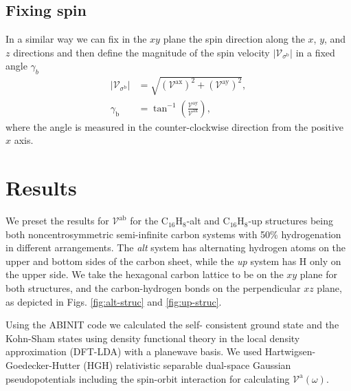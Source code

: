\documentclass[prb,11pt,tightenlines,twocolumn,aps]{revtex4-1}
\begin{document}

\subsection{Fixing spin}\label{sec:theory-fixspin}
In a similar way we can fix in the $xy$ plane the spin direction along the $x$,
$y$, and $z$ directions and then define the magnitude of the spin velocity $|\mathcal{V}_{\sigma^{\mathrm{b}}}|$ in a fixed angle $\gamma_{b}$
\begin{align}
|\mathcal{V}_{\sigma^{\mathrm{b}}}| 
&=
\sqrt{
(\mathcal{V}^{\mathrm{ax}})^{2} +
(\mathcal{V}^{\mathrm{ay}})^{2} 
}, \\
\gamma_{\mathrm{b}} 
&=
\tan^{-1} \left( \frac{\mathcal{V}^{\mathrm{ay}}}
{\mathcal{V}^{\mathrm{ax}}} \right),
\end{align}
where the angle is measured in the counter-clockwise direction from the positive
$x$ axis.



\section{Results} %
\label{sec:results}


We preset the results for $\mathcal{V}^{\mathrm{ab}}$ for the
C$_{16}$H$_{8}$-alt and C$_{16}$H$_{8}$-up structures being both
noncentrosymmetric semi-infinite carbon systems with 50\% hydrogenation in
different arrangements. The \emph{alt} system has alternating hydrogen atoms on
the upper and bottom sides of the carbon sheet, while the \emph{up} system has H
only on the upper side. We take the hexagonal carbon lattice to be on the $xy$
plane for both structures, and the carbon-hydrogen bonds on the perpendicular
$xz$ plane, as depicted in Figs.
\ref{fig:alt-struc} and \ref{fig:up-struc}.

Using the ABINIT code \cite{gonzeCPC09} we calculated the self- consistent
ground state and the Kohn-Sham states using density functional theory in the
local density approximation (DFT-LDA) with a planewave basis. We used
Hartwigsen- Goedecker-Hutter (HGH) relativistic separable dual-space Gaussian
pseudopotentials \cite{hartwigsenPRB98} including the spin-orbit interaction
for calculating $\mathcal{V}^{\mathrm{a}}(\omega)$.
\end{document}
